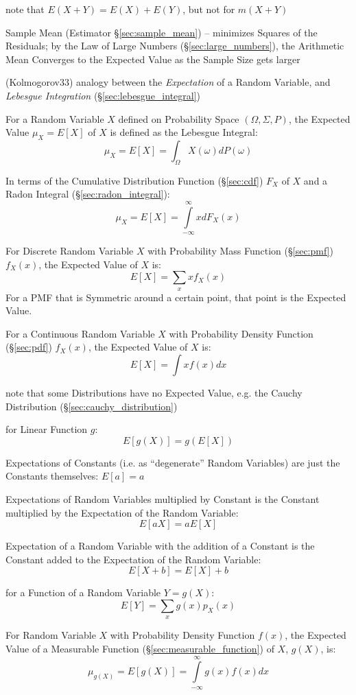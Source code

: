 note that $E(X + Y) = E(X) + E(Y)$, but not for $m(X+Y)$

\fist Sample Mean (Estimator \S\ref{sec:sample_mean}) -- minimizes Squares of
the Residuals;
by the Law of Large Numbers (\S\ref{sec:large_numbers}), the Arithmetic Mean
Converges to the Expected Value as the Sample Size gets larger

(Kolmogorov33) analogy between the \emph{Expectation} of a Random Variable, and
\emph{Lebesgue Integration} (\S\ref{sec:lebesgue_integral})

For a Random Variable $X$ defined on Probability Space $(\Omega,\Sigma,P)$, the
Expected Value $\mu_X = E[X]$ of $X$ is defined as the Lebesgue Integral:
\[
  \mu_X = E[X] = \int_\Omega X(\omega) dP(\omega)
\]

In terms of the Cumulative Distribution Function (\S\ref{sec:cdf}) $F_X$ of $X$
and a Radon Integral (\S\ref{sec:radon_integral}):
\[
  \mu_X = E[X] = \int\limits_{-\infty}^{\infty} x dF_X(x)
\]

For Discrete Random Variable $X$ with Probability Mass Function
(\S\ref{sec:pmf}) $f_X(x)$, the Expected Value of $X$ is:
\[
  E[X] = \sum_x x f_X(x)
\]
For a PMF that is Symmetric around a certain point, that point is the Expected
Value.

For a Continuous Random Variable $X$ with Probability Density Function
(\S\ref{sec:pdf}) $f_X(x)$, the Expected Value of $X$ is:
\[
  E[X] = \int x f(x) dx
\]

note that some Distributions have no Expected Value, e.g. the Cauchy
Distribution (\S\ref{sec:cauchy_distribution})

for Linear Function $g$:
\[
  E[g(X)] = g(E[X])
\]

Expectations of Constants (i.e. as ``degenerate'' Random Variables) are just
the Constants themselves: $E[a] = a$

Expectations of Random Variables multiplied by Constant is the Constant
multiplied by the Expectation of the Random Variable:
\[
  E[aX] = aE[X]
\]

Expectation of a Random Variable with the addition of a Constant is the
Constant added to the Expectation of the Random Variable:
\[
  E[X + b] = E[X] + b
\]

for a Function of a Random Variable $Y = g(X)$:
\[
  E[Y] = \sum_x g(x) p_X(x)
\]

For Random Variable $X$ with Probability Density Function $f(x)$, the
Expected Value of a Measurable Function
(\S\ref{sec:measurable_function}) of $X$, $g(X)$, is:
\[
  \mu_{g(X)} = E[g(X)] = \int\limits_{-\infty}^{\infty} g(x) f(x) dx
\]

